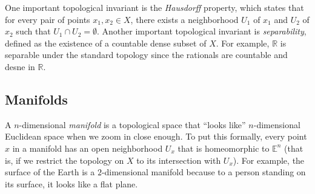 \documentclass[12pt]{article}
\begin{document}
One important topological invariant is the {\it Hausdorff} property, which
states that for every pair of points $x_1,x_2 \in X$, there exists a
neighborhood $U_1$ of $x_1$ and $U_2$ of $x_2$ such that 
$U_1 \cap U_2 = \emptyset$.
Another important topological invariant is {\it separability}, defined as
the existence of a countable dense subset of $X$.
For example, $\mathbb{R}$ is separable under the standard topology since
the rationals are countable and desne in $\mathbb{R}$.

\subsection*{Manifolds}

A $n$-dimensional {\it manifold} is a topological space that ``looks like''
$n$-dimensional Euclidean space when we zoom in close enough.
To put this formally, every point $x$ in a manifold has an open neighborhood 
$U_x$ that is homeomorphic to $\mathbb{E}^n$ (that is, if we restrict the 
topology on $X$ to its intersection with $U_x$).
For example, the surface of the Earth is a $2$-dimensional manifold because
to a person standing on its surface, it looks like a flat plane.
\end{document}

